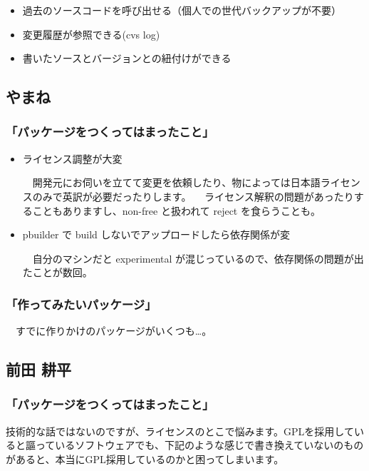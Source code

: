 \documentclass[mingoth,a4paper]{jsarticle}
\begin{document}
\begin{itemize}
 \item  過去のソースコードを呼び出せる（個人での世代バックアップが不要）
 \item  変更履歴が参照できる(cvs log)
 \item  書いたソースとバージョンとの紐付けができる
\end{itemize}


\subsection{やまね}

\subsubsection{「パッケージをつくってはまったこと」}
\begin{itemize}
 
 \item  ライセンス調整が大変

 　開発元にお伺いを立てて変更を依頼したり、物によっては日本語ライセンスのみで英訳が必要だったりします。
 　ライセンス解釈の問題があったりすることもありますし、non-free と扱われて reject を食らうことも。

 \item  pbuilder で build しないでアップロードしたら依存関係が変

 　自分のマシンだと experimental が混じっているので、依存関係の問題が出たことが数回。
\end{itemize}

\subsubsection{「作ってみたいパッケージ」}

　すでに作りかけのパッケージがいくつも…。

\subsection{前田 耕平}
\subsubsection{「パッケージをつくってはまったこと」}

技術的な話ではないのですが、ライセンスのとこで悩みます。GPLを採用していると謳っているソフトウェアでも、下記のような感じで書き換えていないのものがあると、本当にGPL採用しているのかと困ってしまいます。
\end{document}
